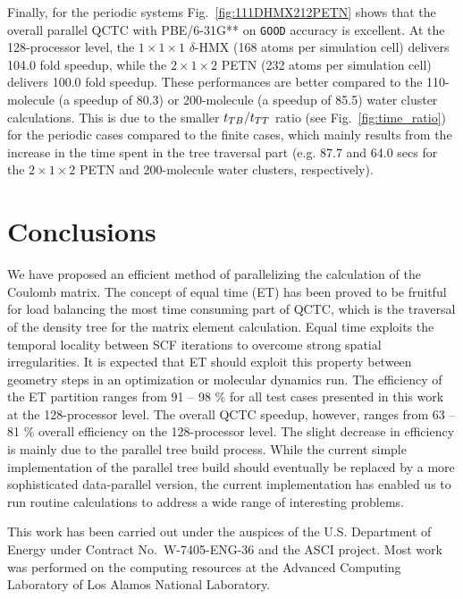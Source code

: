 \commentoutA{\documentclass[prl,aps,twocolumn,twocolumngrid,superbib]{revtex4}}
\begin{document}
Finally, for the periodic systems Fig.~\ref{fig:111DHMX212PETN} shows
that the overall parallel QCTC with PBE/6-31G** on {\tt GOOD} accuracy
is excellent. At the 128-processor level, the $1\times 1\times 1$
$\delta$-HMX (168 atoms per simulation cell) delivers 104.0 fold
speedup, while the $2\times 1 \times 2$ PETN (232 atoms per simulation
cell) delivers 100.0 fold speedup. These performances are better
compared to the 110-molecule (a speedup of 80.3) or 200-molecule (a
speedup of 85.5) water cluster calculations. This is due to the
smaller $t_{TB}/t_{TT}$ ratio (see Fig.~\ref{fig:time_ratio}) for the
periodic cases compared to the finite cases, which mainly results from
the increase in the time spent in the tree traversal part (e.g. 87.7
and 64.0 secs for the $2\times 1 \times 2$ PETN and 200-molecule water
clusters, respectively).

\section{Conclusions}
\label{conclusions}
We have proposed an efficient method of parallelizing the calculation
of the Coulomb matrix. The concept of equal time (ET) has been proved
to be fruitful for load balancing the most time consuming part of
QCTC, which is the traversal of the density tree for the matrix
element calculation.  Equal time exploits the temporal locality
between SCF iterations to overcome strong spatial irregularities. It
is expected that ET should exploit this property between geometry
steps in an optimization or molecular dynamics run.  The efficiency of
the ET partition ranges from 91 -- 98 \% for all test cases presented
in this work at the 128-processor level. The overall QCTC speedup,
however, ranges from 63 -- 81 \% overall efficiency on the
128-processor level. The slight decrease in efficiency is mainly due
to the parallel tree build process.  While the current simple
implementation of the parallel tree build should eventually be
replaced by a more sophisticated data-parallel version, the current
implementation has enabled us to run routine
calculations\cite{CGan04C,CGan04A} to address a wide range of
interesting problems.

\begin{acknowledgments}
This work has been carried out under the auspices of the
U.S. Department of Energy under Contract No.~W-7405-ENG-36 and the
ASCI project.  Most work was performed on the computing resources at
the Advanced Computing Laboratory of Los Alamos National Laboratory.
\end{acknowledgments}

 
\end{document}
